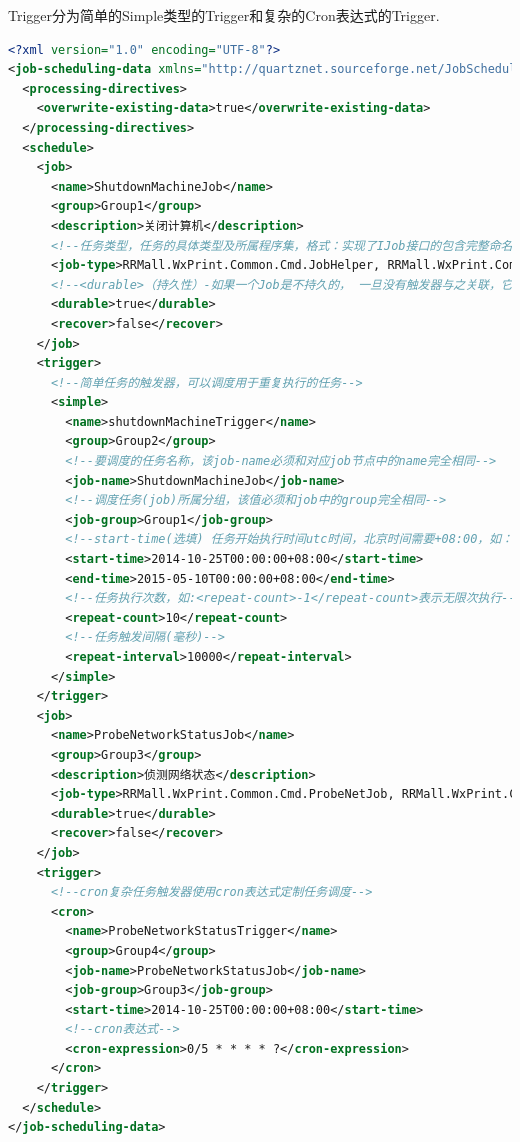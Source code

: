 \documentclass{book}
\begin{document}
Trigger分为简单的Simple类型的Trigger和复杂的Cron表达式的Trigger.

\begin{lstlisting}[language=XML]
<?xml version="1.0" encoding="UTF-8"?>
<job-scheduling-data xmlns="http://quartznet.sourceforge.net/JobSchedulingData" xmlns:xsi="http://www.w3.org/2001/XMLSchema-instance" version="2.0">
  <processing-directives>
    <overwrite-existing-data>true</overwrite-existing-data>
  </processing-directives>
  <schedule>
    <job>
      <name>ShutdownMachineJob</name>
      <group>Group1</group>
      <description>关闭计算机</description>
      <!--任务类型，任务的具体类型及所属程序集，格式：实现了IJob接口的包含完整命名空间的类名,程序集名称-->
      <job-type>RRMall.WxPrint.Common.Cmd.JobHelper, RRMall.WxPrint.Common</job-type>
      <!--<durable>（持久性）-如果一个Job是不持久的， 一旦没有触发器与之关联，它就会被从scheduler 中自动删除-->
      <durable>true</durable>
      <recover>false</recover>
    </job>
    <trigger>
      <!--简单任务的触发器，可以调度用于重复执行的任务-->
      <simple>
        <name>shutdownMachineTrigger</name>
        <group>Group2</group>
        <!--要调度的任务名称，该job-name必须和对应job节点中的name完全相同-->
        <job-name>ShutdownMachineJob</job-name>
        <!--调度任务(job)所属分组，该值必须和job中的group完全相同-->
        <job-group>Group1</job-group>
        <!--start-time(选填) 任务开始执行时间utc时间，北京时间需要+08:00，如：<start-time>2012-04-01T08:00:00+08:00</start-time>表示北京时间2012年4月1日上午8:00开始执行，注意服务启动或重启时都会检测此属性，若没有设置此属性或者start-time设置的时间比当前时间较早，则服务启动后会立即执行一次调度，若设置的时间比当前时间晚，服务会等到设置时间相同后才会第一次执行任务，一般若无特殊需要请不要设置此属性-->
        <start-time>2014-10-25T00:00:00+08:00</start-time>
        <end-time>2015-05-10T00:00:00+08:00</end-time>
        <!--任务执行次数，如:<repeat-count>-1</repeat-count>表示无限次执行-->
        <repeat-count>10</repeat-count>
        <!--任务触发间隔(毫秒)-->
        <repeat-interval>10000</repeat-interval>
      </simple>
    </trigger>
    <job>
      <name>ProbeNetworkStatusJob</name>
      <group>Group3</group>
      <description>侦测网络状态</description>      
      <job-type>RRMall.WxPrint.Common.Cmd.ProbeNetJob, RRMall.WxPrint.Common</job-type>
      <durable>true</durable>
      <recover>false</recover>      
    </job>
    <trigger>
      <!--cron复杂任务触发器使用cron表达式定制任务调度-->
      <cron>
        <name>ProbeNetworkStatusTrigger</name>
        <group>Group4</group>
        <job-name>ProbeNetworkStatusJob</job-name>
        <job-group>Group3</job-group>
        <start-time>2014-10-25T00:00:00+08:00</start-time>
        <!--cron表达式-->
        <cron-expression>0/5 * * * * ?</cron-expression>
      </cron>
    </trigger>
  </schedule>
</job-scheduling-data>
\end{lstlisting}
\end{document}
